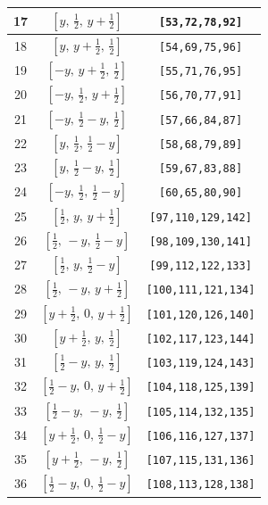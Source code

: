 \documentclass[fleqn,8pt]{jsarticle}
\begin{document}
\begin{longtable}{ccc}
17 & $\left[ y,\, \frac{1}{2},\, y + \frac{1}{2} \right]$ & {\tt [53,72,78,92]} \\ \hline
18 & $\left[ y,\, y + \frac{1}{2},\, \frac{1}{2} \right]$ & {\tt [54,69,75,96]} \\ \hline
19 & $\left[ - y,\, y + \frac{1}{2},\, \frac{1}{2} \right]$ & {\tt [55,71,76,95]} \\ \hline
20 & $\left[ - y,\, \frac{1}{2},\, y + \frac{1}{2} \right]$ & {\tt [56,70,77,91]} \\ \hline
21 & $\left[ - y,\, \frac{1}{2} - y,\, \frac{1}{2} \right]$ & {\tt [57,66,84,87]} \\ \hline
22 & $\left[ y,\, \frac{1}{2},\, \frac{1}{2} - y \right]$ & {\tt [58,68,79,89]} \\ \hline
23 & $\left[ y,\, \frac{1}{2} - y,\, \frac{1}{2} \right]$ & {\tt [59,67,83,88]} \\ \hline
24 & $\left[ - y,\, \frac{1}{2},\, \frac{1}{2} - y \right]$ & {\tt [60,65,80,90]} \\ \hline
25 & $\left[ \frac{1}{2},\, y,\, y + \frac{1}{2} \right]$ & {\tt [97,110,129,142]} \\ \hline
26 & $\left[ \frac{1}{2},\, - y,\, \frac{1}{2} - y \right]$ & {\tt [98,109,130,141]} \\ \hline
27 & $\left[ \frac{1}{2},\, y,\, \frac{1}{2} - y \right]$ & {\tt [99,112,122,133]} \\ \hline
28 & $\left[ \frac{1}{2},\, - y,\, y + \frac{1}{2} \right]$ & {\tt [100,111,121,134]} \\ \hline
29 & $\left[ y + \frac{1}{2},\, 0,\, y + \frac{1}{2} \right]$ & {\tt [101,120,126,140]} \\ \hline
30 & $\left[ y + \frac{1}{2},\, y,\, \frac{1}{2} \right]$ & {\tt [102,117,123,144]} \\ \hline
31 & $\left[ \frac{1}{2} - y,\, y,\, \frac{1}{2} \right]$ & {\tt [103,119,124,143]} \\ \hline
32 & $\left[ \frac{1}{2} - y,\, 0,\, y + \frac{1}{2} \right]$ & {\tt [104,118,125,139]} \\ \hline
33 & $\left[ \frac{1}{2} - y,\, - y,\, \frac{1}{2} \right]$ & {\tt [105,114,132,135]} \\ \hline
34 & $\left[ y + \frac{1}{2},\, 0,\, \frac{1}{2} - y \right]$ & {\tt [106,116,127,137]} \\ \hline
35 & $\left[ y + \frac{1}{2},\, - y,\, \frac{1}{2} \right]$ & {\tt [107,115,131,136]} \\ \hline
36 & $\left[ \frac{1}{2} - y,\, 0,\, \frac{1}{2} - y \right]$ & {\tt [108,113,128,138]} \\ \hline

\end{longtable}
\end{document}
